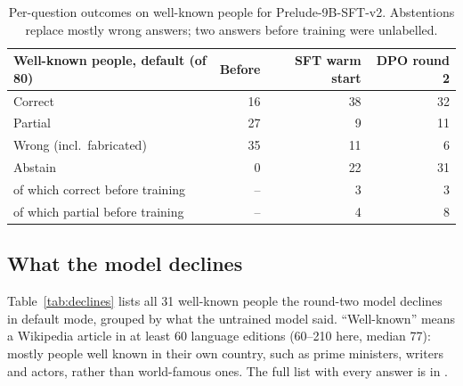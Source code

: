 \documentclass[11pt,a4paper]{article}
\begin{document}
\begin{table}[t]
\centering
\small
\begin{tabular}{@{}lrrr@{}}
\toprule
Well-known people, default (of 80) & Before & SFT warm start & DPO round 2 \\
\midrule
Correct & 16 & 38 & 32 \\
Partial & 27 & 9 & 11 \\
Wrong (incl.\ fabricated) & 35 & 11 & 6 \\
Abstain & 0 & 22 & 31 \\
\quad of which correct before training & -- & 3 & 3 \\
\quad of which partial before training & -- & 4 & 8 \\
\bottomrule
\end{tabular}
\caption{Per-question outcomes on well-known people for Prelude-9B-SFT-v2. Abstentions replace mostly wrong answers; two answers before training were unlabelled.}
\label{tab:transitions}
\end{table}

\subsection{What the model declines}
\label{sec:declines}

Table~\ref{tab:declines} lists all 31 well-known people the round-two model declines in default mode, grouped by what the untrained model said.
``Well-known'' means a Wikipedia article in at least 60 language editions (60--210 here, median 77): mostly people well known in their own country, such as prime ministers, writers and actors, rather than world-famous ones.
The full list with every answer is in .
\end{document}
